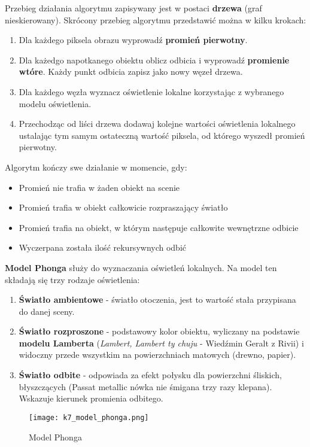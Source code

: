 Przebieg działania algorytmu zapisywany jest w postaci \textbf{drzewa} (graf nieskierowany). Skrócony przebieg algorytmu przedstawić można w kilku krokach:
\begin{enumerate}
	\item Dla każdego piksela obrazu wyprowadź \textbf{promień pierwotny}.
	\item Dla każedgo napotkanego obiektu oblicz odbicia i wyprowadź \textbf{promienie wtóre}. Każdy punkt odbicia zapisz jako nowy węzeł drzewa.
	\item Dla każdego węzła wyznacz oświetlenie lokalne korzystając z wybranego modelu oświetlenia.
	\item Przechodząc od liści drzewa dodawaj kolejne wartości oświetlenia lokalnego ustalając tym samym ostateczną wartość piksela, od którego wyszedł promień pierwotny.
\end{enumerate}

Algorytm kończy swe działanie w momencie, gdy:
\begin{itemize}
	\setlength\itemsep{1pt}
	\item Promień nie trafia w żaden obiekt na scenie
	\item Promień trafia w obiekt całkowicie rozpraszający światło
	\item Promień trafia na obiekt, w którym następuje całkowite wewnętrzne odbicie
	\item Wyczerpana została ilość rekursywnych odbić
\end{itemize}

\textbf{Model Phonga} służy do wyznaczania oświetleń lokalnych. Na model ten składają się trzy rodzaje oświetlenia:
\begin{enumerate}
	\item \textbf{Światło ambientowe} - światło otoczenia, jest to wartość stała przypisana do danej sceny.
	\item \textbf{Światło rozproszone} - podstawowy kolor obiektu, wyliczany na podstawie \textbf{modelu Lamberta} (\textit{Lambert, Lambert ty chuju} - Wiedźmin Geralt z Rivii) i widoczny przede wszystkim na powierzchniach matowych (drewno, papier).
	\item \textbf{Światło odbite} - odpowiada za efekt połysku dla powierzchni śliskich, błyszczących (Passat metallic nówka nie śmigana trzy razy klepana). Wskazuje kierunek promienia odbitego.
\end{enumerate}

\begin{figure}[H]
	\centering
	\texttt{[image: k7\_model\_phonga.png]}
	\caption{Model Phonga}
\end{figure}


